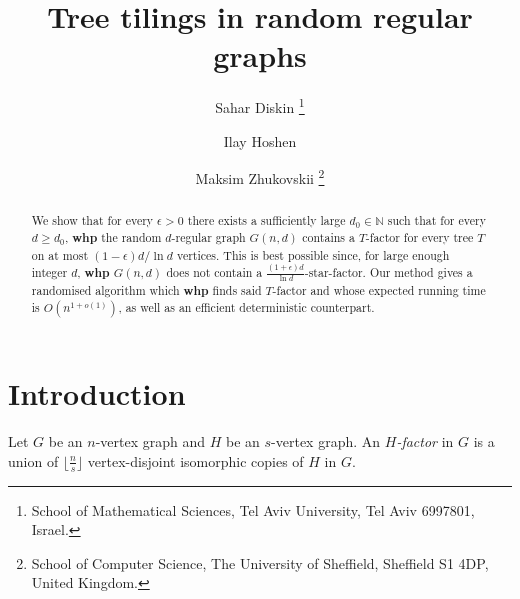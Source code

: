 \documentclass[notitlepage]{scrartcl}
\newcommand{\footremember}[2]{%
    \footnote{#2}
    \newcounter{#1}
    \setcounter{#1}{\value{footnote}}%
}
\newcommand{\footrecall}[1]{%
    \footnotemark[\value{#1}]%
}
\begin{document}
\title{\vspace{-2em}Tree tilings in random regular graphs}
\author{%
Sahar Diskin \footremember{alley}{School of Mathematical Sciences, Tel Aviv University, Tel Aviv 6997801, Israel.}%
\and Ilay Hoshen \footrecall{alley}%
\and Maksim Zhukovskii \footremember{alley2}{School of Computer Science, The University of Sheffield, Sheffield S1 4DP, United Kingdom.}
}


\date{}
\maketitle
\begin{abstract}
We show that for every $\epsilon>0$ there exists a sufficiently large $d_0\in \mathbb{N}$ such that for every $d\ge d_0$, \textbf{whp} the random $d$-regular graph $G(n,d)$ contains a $T$-factor for every tree $T$ on at most $(1-\epsilon)d/\ln d$ vertices. This is best possible since, for large enough integer $d$, \textbf{whp} $G(n,d)$ does not contain a $\frac{(1+\epsilon)d}{\ln d}$-star-factor. Our method gives a randomised algorithm which \textbf{whp} finds said $T$-factor and whose expected running time is $O(n^{1+o(1)})$, as well as an efficient deterministic counterpart.
\end{abstract}


\section{Introduction}
Let $G$ be an $n$-vertex graph and $H$ be an $s$-vertex graph. An \textit{$H$-factor} in $G$ is a union of $\lfloor\frac{n}{s}\rfloor$ vertex-disjoint isomorphic copies of $H$ in $G$. 
\end{document}
